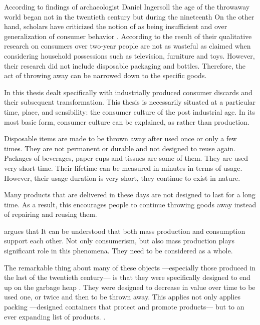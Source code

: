 According to findings of archaeologist Daniel Ingersoll the age of the throwaway world began not in the twentieth century but during the nineteenth \citep[as cited in][41]{rathje1992rubbish} On the other hand, scholars have criticized the notion of  as being insufficient and over generalization of consumer behavior \citep{gregson2007identity}. According to the result of their qualitative research on consumers over two-year people are not as wasteful as claimed when considering household possessions such as television, furniture and toys. However, their research did not include disposable packaging and bottles. Therefore, the act of throwing away can be narrowed down to the specific goods.

In this thesis dealt specifically with industrially produced consumer discards and their subsequent transformation. This thesis is necessarily situated at a particular time, place, and sensibility: the consumer culture of the post industrial age. In its most basic form, consumer culture can be explained, as  \citep[2]{mamiya1992pop} rather than production.

Disposable items are made to be thrown away after used once or only a few times. They are not permanent or durable and not designed to reuse again. Packages of beverages, paper cups and tissues are some of them. They are used very short-time. Their lifetime can be measured in minutes in terms of usage. However, their usage duration is very short, they continue to exist in nature.

Many products that are delivered in these days are not designed to last for a long time. As a result, this encourages people to continue throwing goods away instead of repairing and reusing them.

\citet[9]{hawkins2001plastic} argues that  It can be understood that both mass production and consumption support each other. Not only consumerism, but also mass production plays significant role in this phenomena. They need to be considered as a whole.

The remarkable thing about many of these objects ---especially those produced in the last of the twentieth century--- is that they were specifically designed to end up on the garbage heap \citep{cerny1996recycled}. They were designed to decrease in value over time to be used one, or twice and then to be thrown away. This applies not only applies packing ---designed containers that protect and promote products--- but to an ever expanding list of products.  \citep{cerny1996recycled}.

